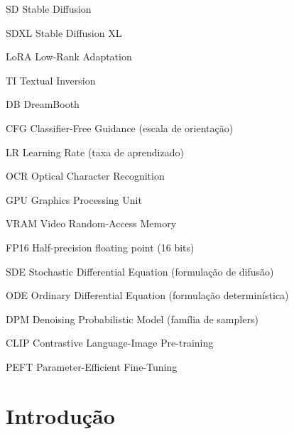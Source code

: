 \documentclass[12pt, %
openright, 
oneside, %
a4paper,    %
brazil]{facom-ufu-abntex2}
\begin{document}
\begin{siglas}
    \item[SD] Stable Diffusion
    \item[SDXL] Stable Diffusion XL
    \item[LoRA] Low-Rank Adaptation
    \item[TI] Textual Inversion
    \item[DB] DreamBooth
    \item[CFG] Classifier-Free Guidance (escala de orientação)
    \item[LR] Learning Rate (taxa de aprendizado)
    \item[OCR] Optical Character Recognition
    \item[GPU] Graphics Processing Unit
    \item[VRAM] Video Random-Access Memory
    \item[FP16] Half-precision floating point (16 bits)
    \item[SDE] Stochastic Differential Equation (formulação de difusão)
    \item[ODE] Ordinary Differential Equation (formulação determinística)
    \item[DPM] Denoising Probabilistic Model (família de samplers)
    \item[CLIP] Contrastive Language-Image Pre-training
    \item[PEFT] Parameter-Efficient Fine-Tuning
  \end{siglas}




\tableofcontents*
\cleardoublepage


\chapter{Introdução}
\end{document}
